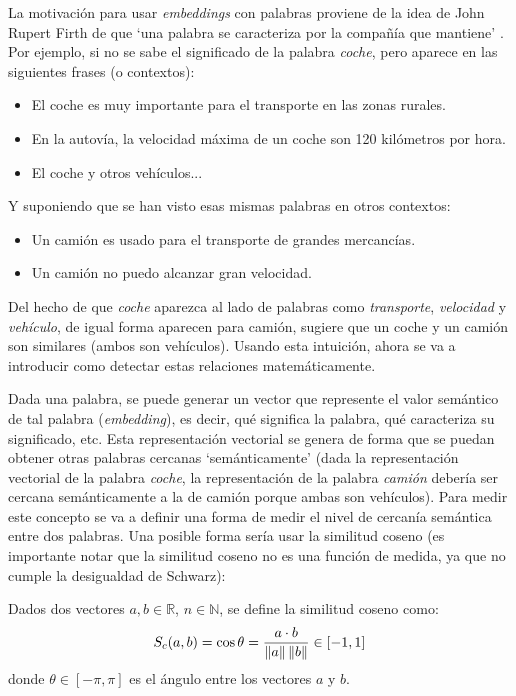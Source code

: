 La motivación para usar \textit{embeddings} con palabras proviene de la idea de John Rupert
Firth de que `una palabra se caracteriza por la compañía que mantiene' \cite{firth1957synopsis}. Por ejemplo, si no se sabe
el significado de la palabra \textit{coche}, pero aparece en las siguientes frases (o contextos):
\begin{itemize}
    \item El coche es muy importante para el transporte en las zonas rurales.
    \item En la autovía, la velocidad máxima de un coche son 120 kilómetros por hora.
    \item El coche y otros vehículos...
\end{itemize}
Y suponiendo que se han visto esas mismas palabras en otros contextos:
\begin{itemize}
    \item Un camión es usado para el transporte de grandes mercancías.
    \item Un camión no puedo alcanzar gran velocidad.
\end{itemize}
Del hecho de que \textit{coche} aparezca al lado de palabras como \textit{transporte}, \textit{velocidad} y \textit{vehículo},
de igual forma aparecen para camión, sugiere que un coche y un camión son similares (ambos son vehículos). Usando esta intuición,
ahora se va a introducir como detectar estas relaciones matemáticamente.


Dada una palabra, se puede generar un vector que represente el valor semántico de tal palabra (\textit{embedding}), es decir, qué significa la palabra, qué caracteriza
su significado, etc. Esta representación vectorial se genera de forma que se puedan obtener otras palabras
cercanas `semánticamente' (dada la representación vectorial de la palabra \textit{coche}, la representación de la palabra \textit{camión}
debería ser cercana semánticamente a la de camión porque ambas son vehículos). Para medir este concepto se va a definir una forma de medir el nivel
de cercanía semántica entre dos palabras. Una posible forma sería usar la similitud coseno (es importante notar que la similitud coseno no es una función de medida,
ya que no cumple la desigualdad de Schwarz):

\begin{definition}
  Dados dos vectores $a,b\in\mathbb{R}$, $n\in\mathbb{N}$, se define la similitud coseno como:
  \[
    S_c(a,b)=\cos\theta = \frac{a\cdot b}{\left\lVert a\right\rVert\left\lVert b\right\rVert} \in [-1, 1]
  \]
donde $\theta\in[-\pi,\pi]$ es el ángulo entre los vectores $a$ y $b$.
\end{definition}

